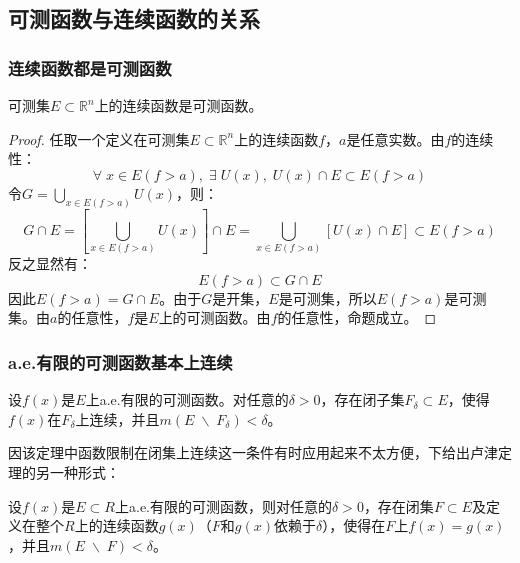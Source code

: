 \subsection{可测函数与连续函数的关系}
\subsubsection{连续函数都是可测函数}
\begin{theorem}
	可测集$E\subset\mathbb{R}^n$上的连续函数是可测函数。
\end{theorem}
\begin{proof}
	任取一个定义在可测集$E\subset\mathbb{R}^{n}$上的连续函数$f$，$a$是任意实数。由$f$的连续性：
	\begin{equation*}
		\forall\;x\in E(f>a),\;\exists\;U(x),\;U(x)\cap E\subset E(f>a)
	\end{equation*}
	令$G=\bigcup\limits_{x\in E(f>a)}U(x)$，则：
	\begin{equation*}
		G\cap E=\left[\bigcup_{x\in E(f>a)}U(x)\right]\cap E=\bigcup_{x\in E(f>a)}\left[U(x)\cap E\right]\subset E(f>a)
	\end{equation*}
	反之显然有：
	\begin{equation*}
		E(f>a)\subset G\cap E
	\end{equation*}
	因此$E(f>a)=G\cap E$。由于$G$是开集，$E$是可测集，所以$E(f>a)$是可测集。由$a$的任意性，$f$是$E$上的可测函数。由$f$的任意性，命题成立。
\end{proof}
\subsubsection{a.e.有限的可测函数基本上连续}
\begin{theorem}[卢津定理]
	设$f(x)$是$E$上a.e.有限的可测函数。对任意的$\delta>0$，存在闭子集$F_\delta\subset E$，使得$f(x)$在$F_\delta$上连续，并且$m(E\;\backslash\;F_\delta)<\delta$。
\end{theorem}
因该定理中函数限制在闭集上连续这一条件有时应用起来不太方便，下给出卢津定理的另一种形式：
\begin{theorem}
	设$f(x)$是$E\subset R$上a.e.有限的可测函数，则对任意的$\delta>0$，存在闭集$F\subset E$及定义在整个$R$上的连续函数$g(x)$（$F$和$g(x)$依赖于$\delta$），使得在$F$上$f(x)=g(x)$，并且$m(E\;\backslash\;F)<\delta$。
\end{theorem}


